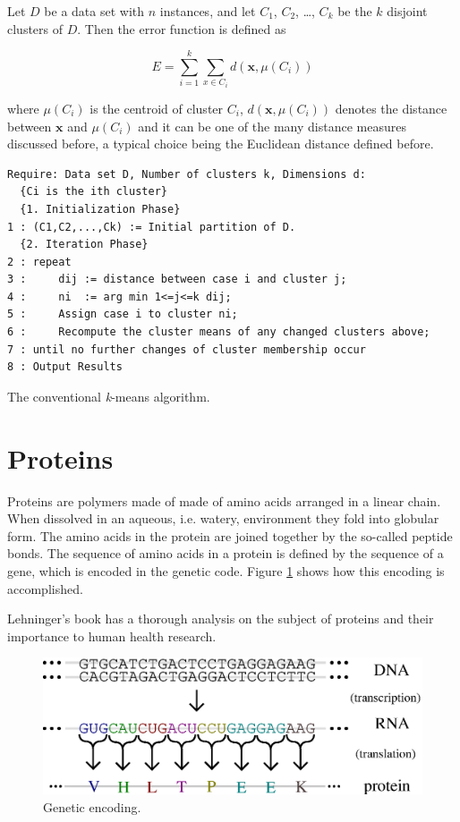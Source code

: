 \documentclass[a4paper,12pt,english]{report}
\begin{document}
Let $D$ be a data set with $n$ instances, and let $C_1$, $C_2$, \ldots, $C_k$ be the $k$ disjoint clusters of $D$. Then the error function is defined as

$$E= \sum_{i=1}^{k} \sum_{x\in C_i} d(\mathbf{x}, \mu (C_i))$$

where $\mu(C_i)$ is the centroid of cluster $C_i$, $d(\mathbf{x}, \mu (C_i))$ denotes the distance between $\mathbf{x}$ and $\mu(C_i)$ and it can be one of the many distance measures discussed before, a typical choice being the Euclidean distance defined before.

\begin{table}[!htb]
\lstset{language=Pascal}
\begin{lstlisting}[frame=single]
Require: Data set D, Number of clusters k, Dimensions d:
  {Ci is the ith cluster}
  {1. Initialization Phase}
1 : (C1,C2,...,Ck) := Initial partition of D.
  {2. Iteration Phase}
2 : repeat
3 :     dij := distance between case i and cluster j;
4 :     ni  := arg min 1<=j<=k dij;
5 :     Assign case i to cluster ni;
6 :     Recompute the cluster means of any changed clusters above;
7 : until no further changes of cluster membership occur
8 : Output Results
\end{lstlisting}
\centering \caption{The conventional \emph{k}-means algorithm.} 
\label{k-means}
\end{table}


\section{Proteins}\label{proteindefinition}

Proteins are polymers made of made of amino acids arranged in a linear chain. When dissolved in an aqueous, i.e. watery, environment they fold into globular form. The amino acids in the protein are joined together by the so-called peptide bonds. The sequence of amino acids in a protein is defined by the sequence of a gene, which is encoded in the genetic code. Figure \ref{geneticcode} shows how this encoding is accomplished.

Lehninger's book\cite{proteinsbook} has a thorough analysis on the subject of proteins and their importance to human health research.


\begin{figure}[!ht]
\begin{center}
\includegraphics [width=13cm]{images/Genetic_code.eps}
\end{center}
\caption{Genetic encoding.}
\label{geneticcode}
\end{figure}
\end{document}
